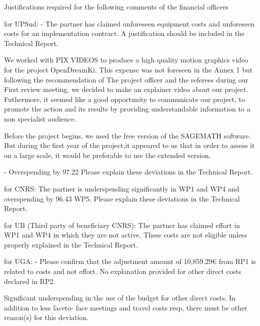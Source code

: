 
Justifications required for the following comments of the financial officers 

for UPSud:
- The partner has claimed unforeseen equipment costs and unforeseen costs for an
implementation contract. A justification should be included in the Technical Report.

We worked with PIX VIDEOS to produce a high quality motion graphics video for
the project OpenDreamKi. This expense was not foreseen in the Annex 1 but following the
recommendation of The project officer and the referees during our First review meeting, we decided to
make an explainer video about our project. Futhermore, it seemed like a good opportunity to communicate
our project, to promote the action and its results by providing understandable information to a non
specialist audience.

Before the project begins, we used the free version of the SAGEMATH software. But
during the first year of the project,it appeared to us that in order to assess it on a large scale, it would
be preferable to use the extended version.

- Overspending by 97.22%
Please explain these deviations in the Technical Report.

for CNRS:
The partner is underspending significantly in WP1 and WP4 and overspending by 96.43%
WP5. Please explain these deviations in the Technical Report.

for UB (Third party of beneficiary CNRS):
The partner has claimed effort in WP1 and WP4 in which they are not active. These costs are
not eligible unless properly explained in the Technical Report.

for UGA: 
- Please confirm that the adjustment amount of 10,859.29€ from RP1 is related to costs and not
effort. No explanation provided for other direct costs declared in RP2.

Significant underspending in the use of the budget for other direct costs. In addition to less faceto-
face meetings and travel costs resp, there must be other reason(s) for this deviation.

